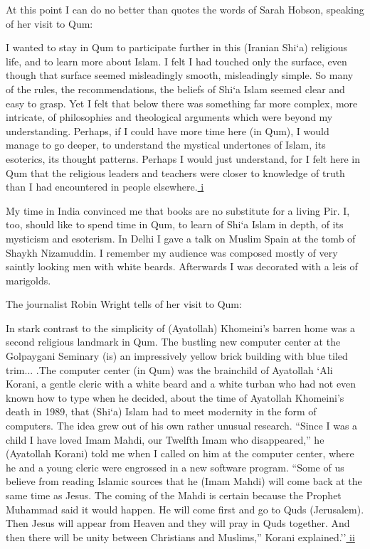 At this point I can do no better than quotes the words of Sarah Hobson, speaking of her visit to Qum:

\begin{quotex}
I wanted to stay in Qum to participate further in this (Iranian Shi`a) religious life, and to learn more about Islam. I felt I had touched only the surface, even though that surface seemed misleadingly smooth, misleadingly simple. So many of the rules, the recommendations, the beliefs of Shi`a Islam seemed clear and easy to grasp. Yet I felt that below there was something far more complex, more intricate, of philosophies and theological arguments which were beyond my understanding. Perhaps, if I could have more time here (in Qum), I would manage to go deeper, to understand the mystical undertones of Islam, its esoterics, its thought patterns. Perhaps I would just understand, for I felt here in Qum that the religious leaders and teachers were closer to knowledge of truth than I had encountered in people elsewhere.\hyperref[_edn1]{ i }
\end{quotex}


My time in India convinced me that books are no substitute for a living Pir. I, too, should like to spend time in Qum, to learn of Shi`a Islam in depth, of its mysticism and esoterism. In Delhi I gave a talk on Muslim Spain at the tomb of Shaykh Nizamuddin. I remember my audience was composed mostly of very saintly looking men with white beards. Afterwards I was decorated with a leis of marigolds.

The journalist Robin Wright tells of her visit to Qum:

In stark contrast to the simplicity of (Ayatollah) Khomeini's barren home was a second religious landmark in Qum. The bustling new computer center at the Golpaygani Seminary (is) an impressively yellow brick building with blue tiled trim... .The computer center (in Qum) was the brainchild of Ayatollah `Ali Korani, a gentle cleric with a white beard and a white turban who had not even known how to type when he decided, about the time of Ayatollah Khomeini's death in 1989, that (Shi`a) Islam had to meet modernity in the form of computers. The idea grew out of his own rather unusual research. ``Since I was a child I have loved Imam Mahdi, our Twelfth Imam who disappeared,'' he (Ayatollah Korani) told me when I called on him at the computer center, where he and a young cleric were engrossed in a new software program. ``Some of us believe from reading Islamic sources that he (Imam Mahdi) will come back at the same time as Jesus. The coming of the Mahdi is certain because the Prophet Muhammad said it would happen. He will come first and go to Quds (Jerusalem). Then Jesus will appear from Heaven and they will pray in Quds together. And then there will be unity between Christians and Muslims,'' Korani explained.''\hyperref[_edn2]{ ii }

